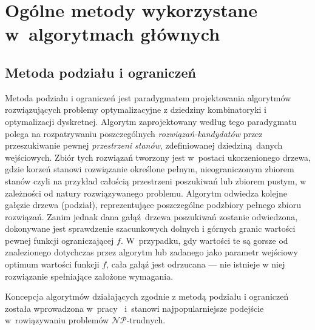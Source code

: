 \section{Ogólne metody wykorzystane w~algorytmach głównych}\label{s_methods}

\subsection{Metoda podziału i ograniczeń}\label{ss_branch_and_bound}
\par{
  Metoda podziału i ograniczeń jest paradygmatem projektowania algorytmów rozwiązujących problemy optymalizacyjne z dziedziny kombinatoryki i optymalizacji dyskretnej.
  Algorytm zaprojektowany według tego paradygmatu polega na rozpatrywaniu poszczególnych \emph{rozwiązań-kandydatów} przez przeszukiwanie pewnej \emph{przestrzeni stanów}, zdefiniowanej dziedziną danych wejściowych.
  Zbiór tych rozwiązań tworzony jest w~postaci ukorzenionego drzewa, gdzie korzeń stanowi rozwiązanie określone pełnym, nieograniczonym zbiorem stanów czyli na przykład całością przestrzeni poszukiwań lub zbiorem pustym, w zależności od natury rozwiązywanego problemu.
  Algorytm odwiedza kolejne gałęzie drzewa (podział), reprezentujące poszczególne
  podzbiory pełnego zbioru rozwiązań.
  Zanim jednak dana gałąź~drzewa poszukiwań zostanie odwiedzona, dokonywane jest sprawdzenie szacunkowych dolnych i górnych granic wartości pewnej funkcji ograniczającej $f$.
  W~przypadku, gdy wartości te są gorsze od znalezionego dotychczas przez algorytm lub zadanego jako parametr wejściowy optimum wartości funkcji $f$, cała gałąź jest odrzucana --- nie istnieje w niej rozwiązanie spełniające założone wymagania.
}
\par{
  Koncepcja algorytmów działających zgodnie z metodą podziału i ograniczeń została wprowadzona w~pracy~\cite{land60} i~stanowi najpopularniejsze podejście w~rowiązywaniu problemów $\mathcal{NP}$-trudnych.
}

